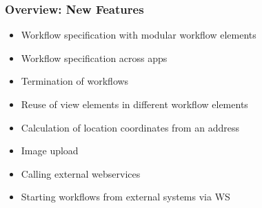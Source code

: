 
\begin{frame}
\frametitle{Overview: New Features}

\begin{itemize}
	\item Workflow specification with modular workflow elements
	\item Workflow specification across apps
	\item Termination of workflows
	\item Reuse of view elements in different workflow elements
	\item Calculation of location coordinates from an address
	\item Image upload
	\item Calling external webservices
	\item Starting workflows from external systems via WS
\end{itemize}
\end{frame}


